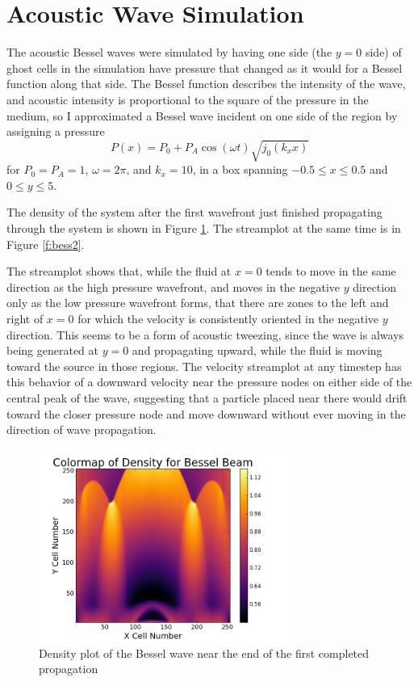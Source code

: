 \documentclass{article}
\begin{document}
\section{Acoustic Wave Simulation}
The acoustic Bessel waves were simulated by having one side (the $y=0$ side) of ghost cells in the simulation have pressure that changed as it would for a Bessel function along that side. The Bessel function describes the intensity of the wave, and acoustic intensity is proportional to the square of the pressure in the medium, so I approximated a Bessel wave incident on one side of the region by assigning a pressure $$ P(x) = P_0 + P_A \cos(\omega t)\sqrt{j_0(k_x x)} $$ for $P_0=P_A = 1$, $\omega = 2 \pi$, and $k_x = 10$, in a box spanning $-0.5 \leq x \leq 0.5$ and $ 0 \leq y \leq 5$.

The density of the system after the first wavefront just finished propagating through the system is shown in Figure \ref{f:bess1}. The streamplot at the same time is in Figure \ref{f:bess2}. 

The streamplot shows that, while the fluid at $x=0$ tends to move in the same direction as the high pressure wavefront, and moves in the negative $y$ direction only as the low pressure wavefront forms, that there are zones to the left and right of $x=0$ for which the velocity is consistently oriented in the negative $y$ direction. This seems to be a form of acoustic tweezing, since the wave is always being generated at $y=0$ and propagating upward, while the fluid is moving toward the source in those regions.  The velocity streamplot at any timestep has this behavior of a downward velocity near the pressure nodes on either side of the central peak of the wave, suggesting that a particle placed near there would drift toward the closer pressure node and move downward without ever moving in the direction of wave propagation.
 \begin{figure}
     \centering
     \includegraphics[width=0.75\textwidth]{bess1.png}
     \caption{Density plot of the Bessel wave near the end of the first completed propagation}
     \label{f:bess1}
 \end{figure}
 
\end{document}
